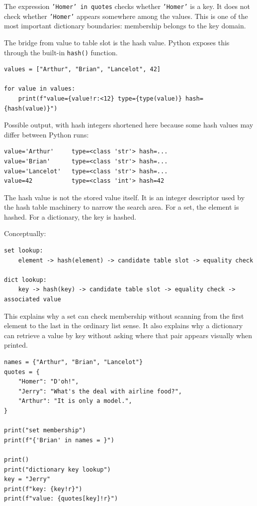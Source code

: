 The expression \texttt{'Homer' in quotes} checks whether \texttt{'Homer'} is a key. It does not check whether \texttt{'Homer'} appears somewhere among the values. This is one of the most important dictionary boundaries: membership belongs to the key domain.

The bridge from value to table slot is the hash value. Python exposes this through the built-in \texttt{hash()} function.

\begin{verbatim}
values = ["Arthur", "Brian", "Lancelot", 42]

for value in values:
    print(f"value={value!r:<12} type={type(value)} hash={hash(value)}")
\end{verbatim}

Possible output, with hash integers shortened here because some hash values may differ between Python runs:

\begin{verbatim}
value='Arthur'     type=<class 'str'> hash=...
value='Brian'      type=<class 'str'> hash=...
value='Lancelot'   type=<class 'str'> hash=...
value=42           type=<class 'int'> hash=42
\end{verbatim}

The hash value is not the stored value itself. It is an integer descriptor used by the hash table machinery to narrow the search area. For a set, the element is hashed. For a dictionary, the key is hashed.

Conceptually:

\begin{verbatim}
set lookup:
    element -> hash(element) -> candidate table slot -> equality check

dict lookup:
    key -> hash(key) -> candidate table slot -> equality check -> associated value
\end{verbatim}

This explains why a set can check membership without scanning from the first element to the last in the ordinary list sense. It also explains why a dictionary can retrieve a value by key without asking where that pair appears visually when printed.

\begin{verbatim}
names = {"Arthur", "Brian", "Lancelot"}
quotes = {
    "Homer": "D'oh!",
    "Jerry": "What's the deal with airline food?",
    "Arthur": "It is only a model.",
}

print("set membership")
print(f"{'Brian' in names = }")

print()
print("dictionary key lookup")
key = "Jerry"
print(f"key: {key!r}")
print(f"value: {quotes[key]!r}")
\end{verbatim}

